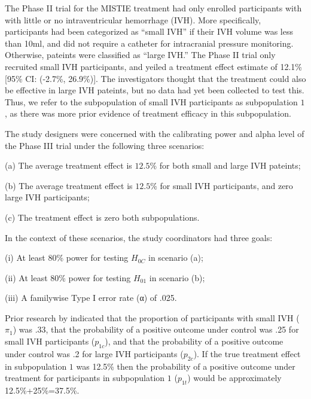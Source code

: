 \documentclass[article]{jss}
\begin{document}
The Phase II trial for the MISTIE treatment had only enrolled participants with with little or no intraventricular hemorrhage (IVH). More specifically, participants had been categorized as ``small IVH'' if their IVH volume was less than 10ml, and did not require a catheter for intracranial pressure monitoring. Otherwise, pateints were classified as ``large IVH.'' The Phase II trial only recruited small IVH participants, and yeiled a treatment effect estimate of 12.1\% [95\% CI: (-2.7\%, 26.9\%)]. The investigators thought that the treatment could also be effective in large IVH pateints, but no data had yet been collected to test this. Thus, we refer to the subpopulation of small IVH participants as subpopulation $1$, as there was more prior evidence of treatment efficacy in this subpopulation.

 The study designers were concerned with the calibrating power and alpha level of the Phase III trial under the following three scenarios:


\begin{description}
\item  (a) The average treatment effect is $12.5\%$ for both small and large IVH pateints;
\item  (b) The average treatment effect is $12.5\%$ for small IVH participants, and zero large IVH participants;
\item  (c) The treatment effect is zero both subpopulations. 
\end{description}

In the context of these scenarios, the study coordinators had three goals:

\begin{description}
\item  (i) At least 80\% power for testing $H_{0C}$ in scenario (a);
\item  (ii) At least 80\% power for testing $H_{01}$ in scenario (b);
\item  (iii) A familywise Type I error rate (α) of .025.
\end{description}

Prior research by \cite{Hanley2012} indicated that the proportion of participants with small IVH ($π_1$) was .33, that the probability of a positive outcome under control was .25 for small IVH participants ($p_{1c}$), and that the probability of a positive outcome under control was .2 for large IVH participants ($p_{2c}$).  If the true treatment effect in subpopulation $1$ was 12.5\% then the probability of a positive outcome under treatment for participants in subpopulation $1$ ($p_{1t}$) would be approximately 12.5\%+25\%=37.5\%.
\end{document}
